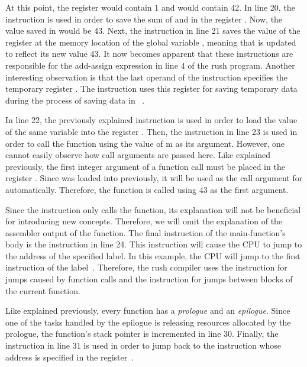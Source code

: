 At this point, the register  would contain 1 and  would contain 42.
In line 20, the  instruction is used in order to save the sum of  and  in the register .
Now, the value saved in  would be 43.
Next, the  instruction in line 21 saves the value of the register  at the memory location of the global variable , meaning that  is updated to reflect its new value 43.
It now becomes apparent that these instructions are responsible for the add-assign expression in line 4 of the rush program.
Another interesting observation is that the last operand of the  instruction specifies the temporary register .
The instruction uses this register for saving temporary data during the process of saving data in ~\cite[reference card]{Patterson2017}.

In line 22, the previously explained  instruction is used in order to load the value of the same variable into the register .
Then, the  instruction in line 23 is used in order to call the  function using the value of m as its argument.
However, one cannot easily observe how call arguments are passed here.
Like explained previously, the first integer argument of a function call must be placed in the register .
Since  was loaded into  previously, it will be used as the call argument for  automatically.
Therefore, the  function is called using 43 as the first argument.

Since the  instruction only calls the  function, its explanation will not be beneficial for introducing new concepts.
Therefore, we will omit the explanation of the assembler output of the  function.
The final instruction of the main-function's body is the  instruction in line 24.
This instruction will cause the CPU to jump to the address of the specified label.
In this example, the CPU will jump to the first instruction of the  label~\cite[p.~17]{Patterson2017}.
Therefore, the rush compiler uses the  instruction for jumps caused by function calls and the  instruction for jumps between blocks of the current function.

Like explained previously, every function has a \emph{prologue} and an \emph{epilogue}.
Since one of the tasks handled by the epilogue is releasing resources allocated by the prologue, the function's stack pointer is incremented in line 30.
Finally, the  instruction in line 31 is used in order to jump back to the instruction whose address is specified in the  register~\cite[reference card]{Patterson2017}.

